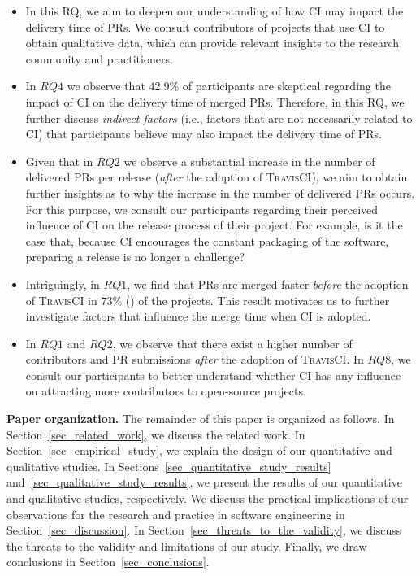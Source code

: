 \begin{itemize}
    \item \textit{\textbf{\RQfive}}
    In this RQ, we aim to deepen our understanding of how CI may impact the delivery time of PRs. We consult contributors of projects that use CI to obtain qualitative data, which can provide relevant insights to the research community and practitioners. 
    
    \item \textit{\textbf{\RQfour}} 		
    In $RQ4$ we observe that 42.9\% of participants are skeptical regarding the impact of CI on the delivery time of merged PRs. Therefore, in this RQ, we further discuss {\em indirect factors} (i.e., factors that are not necessarily related to CI) that participants believe may also impact the delivery time of PRs.

    \item \textit{\textbf{\RQsix}}
    Given that in $RQ2$ we observe a substantial increase in the number of delivered PRs per release (\textit{after} the adoption of \textsc{TravisCI}), 
    we aim to obtain further insights as to why the increase in the number of delivered PRs occurs. For this purpose, we consult our participants regarding their perceived influence of CI on the release process of their project. For example, is it the case that, because CI encourages the constant packaging of the software, preparing a release is no longer a challenge?	
    
    \item \textit{\textbf{\RQseven}} 
    Intriguingly, in $RQ1$, we find that PRs are merged faster \textit{before} the adoption of \textsc{TravisCI} in 73\% () of the projects. This result motivates us to further investigate factors that influence the merge time when CI is adopted. 
    
    \item \textit{\textbf{\RQeight}}
    In $RQ1$ and $RQ2$, we observe that there exist a higher number of contributors and PR submissions \textit{after} the adoption of \textsc{TravisCI}. In $RQ8$, we consult our participants to better understand whether CI has any influence on attracting more contributors to open-source projects.	
    
\end{itemize}
	
\textbf{Paper organization.}
The remainder of this paper is
organized as follows. 
In Section~\ref{sec_related_work}, we discuss the related work.
In Section~\ref{sec_empirical_study}, we explain the design of our quantitative and qualitative studies.
In Sections~\ref{sec_quantitative_study_results} and~\ref{sec_qualitative_study_results}, we present the results of our quantitative and qualitative studies, respectively. 
We discuss the practical implications of our observations for the research and practice in software engineering in Section~\ref{sec_discussion}. 
In Section~\ref{sec_threats_to_the_validity}, we discuss the threats to the validity and limitations of our study.
Finally, we draw conclusions in Section~\ref{sec_conclusions}. 
